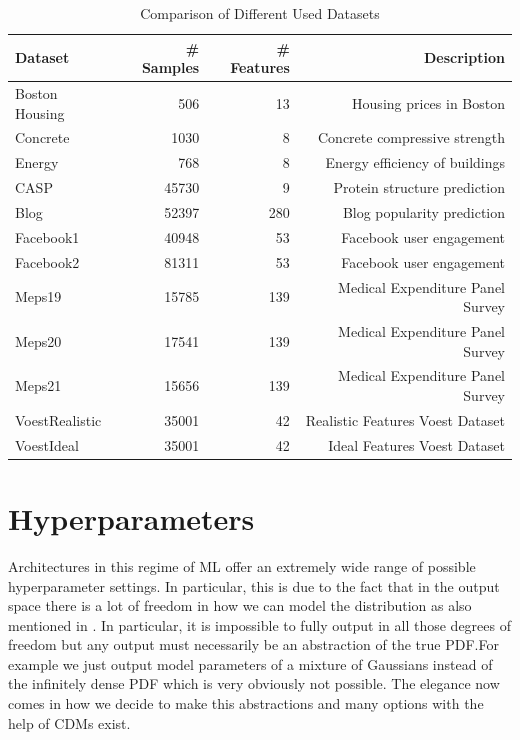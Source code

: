 \begin{table}
    \caption{Comparison of Different Used Datasets}\label{tab:dataset_overview}
    \centering
    \begin{tabular}{lrrr}
        \toprule
        Dataset        & \# Samples & \# Features & Description                      \\
        \midrule
        Boston Housing & 506        & 13          & Housing prices in Boston         \\
        Concrete       & 1030       & 8           & Concrete compressive strength    \\
        Energy         & 768        & 8           & Energy efficiency of buildings   \\
        CASP           & 45730      & 9           & Protein structure prediction     \\
        Blog           & 52397      & 280         & Blog popularity prediction       \\
        Facebook1      & 40948      & 53          & Facebook user engagement         \\
        Facebook2      & 81311      & 53          & Facebook user engagement         \\
        Meps19         & 15785      & 139         & Medical Expenditure Panel Survey \\
        Meps20         & 17541      & 139         & Medical Expenditure Panel Survey \\
        Meps21         & 15656      & 139         & Medical Expenditure Panel Survey \\
        VoestRealistic & 35001      & 42          & Realistic Features Voest Dataset \\
        VoestIdeal     & 35001      & 42          & Ideal Features Voest Dataset     \\
        \bottomrule
    \end{tabular}
\end{table}


\section{Hyperparameters}\label{sec:hyperparameters}

Architectures in this regime of ML offer an extremely wide range of possible hyperparameter settings. In particular, this is due to the fact that in the output space there is a lot of freedom in how we can model the distribution as also mentioned in . In particular, it is impossible to fully output in all those degrees of freedom but any output must necessarily be an abstraction of the true PDF.\@ For example we just output model parameters of a mixture of Gaussians instead of the infinitely dense PDF which is very obviously not possible. The elegance now comes in how we decide to make this abstractions and many options with the help of CDMs exist.

